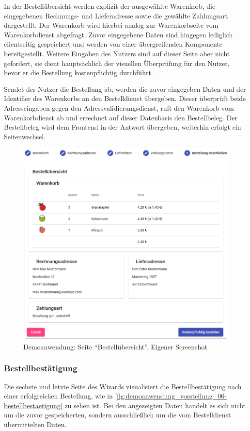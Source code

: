 In der Bestellübersicht werden explizit der ausgewählte Warenkorb, die eingegebenen Rechnungs- und Lieferadresse sowie die gewählte Zahlungsart dargestellt. Der Warenkorb wird hierbei analog zur Warenkorbseite vom Warenkorbdienst abgefragt. Zuvor eingegebene Daten sind hingegen lediglich clientseitig gespeichert und werden von einer übergreifenden Komponente bereitgestellt. Weitere Eingaben des Nutzers sind auf dieser Seite aber nicht gefordert, sie dient hauptsächlich der visuellen Überprüfung für den Nutzer, bevor er die Bestellung kostenpflichtig durchführt.

Sendet der Nutzer die Bestellung ab, werden die zuvor eingegeben Daten und der Identifier des Warenkorbs an den Bestelldienst übergeben. Dieser überprüft beide Adresseingaben gegen den Adressvalidierungsdienst, ruft den Warenkorb vom Warenkorbdienst ab und errechnet auf dieser Datenbasis den Bestellbeleg. Der Bestellbeleg wird dem Frontend in der Antwort übergeben, weiterhin erfolgt ein Seitenwechsel.

\begin{figure}[H]
	\centering
	\includegraphics[width=0.68\linewidth]{img/04_erstellung-poc/demoanwendung_vorstellung_05-bestelluebersicht_cropped}
	\caption{Demoanwendung: Seite \enquote{Bestellübersicht}. Eigener Screenshot}
	\label{fig:demoanwendung_vorstellung_05-bestelluebersicht}
\end{figure}

\subsubsection{Bestellbestätigung}

Die sechste und letzte Seite des Wizards visualisiert die Bestellbestätigung nach einer erfolgreichen Bestellung, wie in \autoref{fig:demoanwendung_vorstellung_06-bestellbestaetigung} zu sehen ist. Bei den angezeigten Daten handelt es sich nicht um die zuvor gespeicherten, sondern ausschließlich um die vom Bestelldienst übermittelten Daten.

